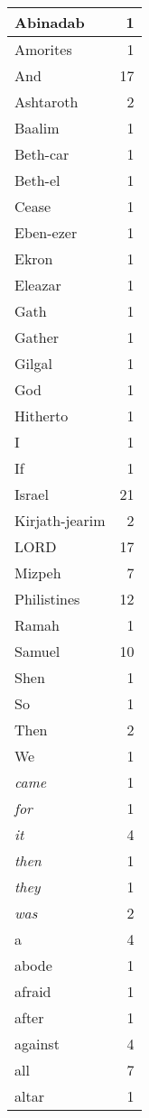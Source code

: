 \begin{center}
\begin{longtable}{l|r}
\hline \hline
\endlastfoot
Abinadab & 1 \\ \hline
Amorites & 1 \\ \hline
And & 17 \\ \hline
Ashtaroth & 2 \\ \hline
Baalim & 1 \\ \hline
Beth-car & 1 \\ \hline
Beth-el & 1 \\ \hline
Cease & 1 \\ \hline
Eben-ezer & 1 \\ \hline
Ekron & 1 \\ \hline
Eleazar & 1 \\ \hline
Gath & 1 \\ \hline
Gather & 1 \\ \hline
Gilgal & 1 \\ \hline
God & 1 \\ \hline
Hitherto & 1 \\ \hline
I & 1 \\ \hline
If & 1 \\ \hline
Israel & 21 \\ \hline
Kirjath-jearim & 2 \\ \hline
LORD & 17 \\ \hline
Mizpeh & 7 \\ \hline
Philistines & 12 \\ \hline
Ramah & 1 \\ \hline
Samuel & 10 \\ \hline
Shen & 1 \\ \hline
So & 1 \\ \hline
Then & 2 \\ \hline
We & 1 \\ \hline
\emph{came} & 1 \\ \hline
\emph{for} & 1 \\ \hline
\emph{it} & 4 \\ \hline
\emph{then} & 1 \\ \hline
\emph{they} & 1 \\ \hline
\emph{was} & 2 \\ \hline
a & 4 \\ \hline
abode & 1 \\ \hline
afraid & 1 \\ \hline
after & 1 \\ \hline
against & 4 \\ \hline
all & 7 \\ \hline
altar & 1 \\ \hline

\end{longtable}
\end{center}
